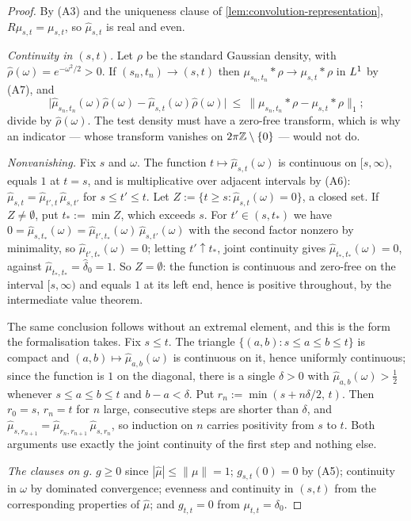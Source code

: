 \begin{proof}
\leanok
By (A3) and the uniqueness clause of \ref{lem:convolution-representation},
$R\mu_{s,t} = \mu_{s,t}$, so $\hat\mu_{s,t}$ is real and even.

\emph{Continuity in $(s,t)$.} Let $\rho$ be the standard Gaussian density, with
$\hat\rho(\omega) = e^{-\omega^2/2} > 0$. If $(s_n,t_n) \to (s,t)$ then
$\mu_{s_n,t_n} * \rho \to \mu_{s,t} * \rho$ in $L^1$ by (A7), and
\[
  \bigl|\hat\mu_{s_n,t_n}(\omega)\hat\rho(\omega) - \hat\mu_{s,t}(\omega)\hat\rho(\omega)\bigr|
  \ \le\ \|\mu_{s_n,t_n} * \rho - \mu_{s,t} * \rho\|_1 ;
\]
divide by $\hat\rho(\omega)$. The test density must have a zero-free transform, which is why an
indicator --- whose transform vanishes on $2\pi\mathbb{Z} \setminus \{0\}$ --- would not do.

\emph{Nonvanishing.} Fix $s$ and $\omega$. The function $t \mapsto \hat\mu_{s,t}(\omega)$ is
continuous on $[s,\infty)$, equals $1$ at $t = s$, and is multiplicative over adjacent intervals
by (A6): $\hat\mu_{s,t} = \hat\mu_{t',t}\,\hat\mu_{s,t'}$ for $s \le t' \le t$. Let
$Z := \{t \ge s : \hat\mu_{s,t}(\omega) = 0\}$, a closed set. If $Z \ne \emptyset$, put
$t_* := \min Z$, which exceeds $s$. For $t' \in (s,t_*)$ we have
$0 = \hat\mu_{s,t_*}(\omega) = \hat\mu_{t',t_*}(\omega)\,\hat\mu_{s,t'}(\omega)$ with the second
factor nonzero by minimality, so $\hat\mu_{t',t_*}(\omega) = 0$; letting $t' \uparrow t_*$,
joint continuity gives $\hat\mu_{t_*,t_*}(\omega) = 0$, against
$\hat\mu_{t_*,t_*} = \hat\delta_0 = 1$. So $Z = \emptyset$: the function is continuous and
zero-free on the interval $[s,\infty)$ and equals $1$ at its left end, hence is positive
throughout, by the intermediate value theorem.

The same conclusion follows without an extremal element, and this is the form the formalisation
takes. Fix $s \le t$. The triangle $\{(a,b) : s \le a \le b \le t\}$ is compact and
$(a,b) \mapsto \hat\mu_{a,b}(\omega)$ is continuous on it, hence uniformly continuous; since the
function is $1$ on the diagonal, there is a single $\delta > 0$ with
$\hat\mu_{a,b}(\omega) > \tfrac12$ whenever $s \le a \le b \le t$ and $b - a < \delta$. Put
$r_n := \min(s + n\delta/2,\, t)$. Then $r_0 = s$, $r_n = t$ for $n$ large, consecutive steps are
shorter than $\delta$, and $\hat\mu_{s,r_{n+1}} = \hat\mu_{r_n,r_{n+1}}\,\hat\mu_{s,r_n}$, so
induction on $n$ carries positivity from $s$ to $t$. Both arguments use exactly the joint
continuity of the first step and nothing else.

\emph{The clauses on $g$.} $g \ge 0$ since $|\hat\mu| \le \|\mu\| = 1$; $g_{s,t}(0) = 0$ by
(A5); continuity in $\omega$ by dominated convergence; evenness and continuity in $(s,t)$ from
the corresponding properties of $\hat\mu$; and $g_{t,t} = 0$ from $\mu_{t,t} = \delta_0$.
\end{proof}

